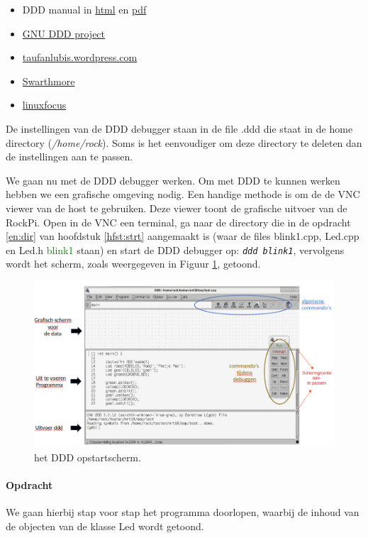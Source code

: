 \begin{itemize}
	\item DDD manual in \href{https://www.gnu.org/software/ddd/manual/html_mono/ddd.html}{html} en \href{https://www.gnu.org/software/ddd/manual/pdf/ddd.pdf}{pdf}
	\item \href{https://www.gnu.org/software/ddd/}{GNU DDD project}
	\item \href{href="https://taufanlubis.wordpress.com/2019/02/19/gnu-debugger-front-end-graphical-user-interface-with-ddd}{taufanlubis.wordpress.com}
	\item  \href{https://www.cs.swarthmore.edu/~newhall/unixhelp/howto_gdb.php}{Swarthmore}
	\item  \href{http://www.linuxfocus.org/English/January1998/article20.html}{linuxfocus}
\end{itemize}

De instellingen van de DDD debugger staan in de file .ddd die staat in de home directory (\textit{/home/rock}). Soms is het eenvoudiger om deze directory te deleten dan de instellingen aan te passen.

We gaan nu met de DDD debugger werken.
Om met DDD te kunnen werken hebben we een grafische omgeving nodig. Een handige methode is om de de VNC viewer van de host te gebruiken. Deze viewer toont de grafische uitvoer van de RockPi. Open in de VNC een terminal, ga naar de directory die in de opdracht \ref{en:dir} van hoofdstuk \ref{hfst:strt}  aangemaakt is (waar de files blink1.cpp, Led.cpp en Led.h \textcolor{green}{blink1} staan) en start de DDD debugger op:
\texttt{\textit{ddd blink1}}, vervolgens wordt het scherm, zoals weergegeven in Figuur \ref{fig:dddscherm1}, getoond.
\begin{figure}[h!]
	\captionsetup{justification=centering}
	\includegraphics[width=0.7 \linewidth]{figuren/ddd_startup_screen}
	\centering
	\caption{het DDD opstartscherm.}
	\label{fig:dddscherm1}
\end{figure}

\paragraph{Opdracht}
We gaan hierbij stap voor stap het programma doorlopen, waarbij de inhoud van de objecten van de klasse Led wordt getoond.

